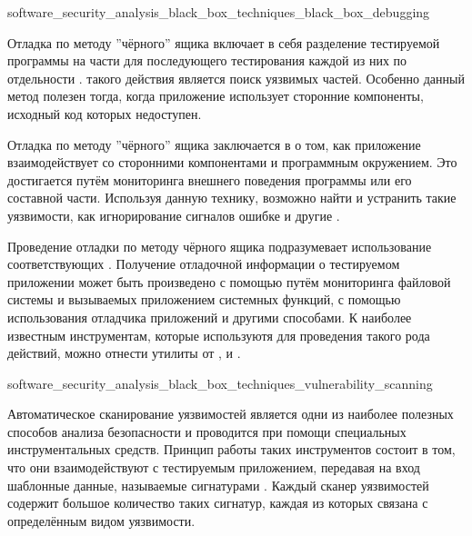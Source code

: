 
	{software_security_analysis_black_box_techniques_black_box_debugging}

%
Отладка по методу ''чёрного'' ящика включает в себя разделение тестируемой программы на части для последующего тестирования каждой из них по отдельности . 
%
 такого действия является поиск уязвимых частей. Особенно данный метод полезен тогда, когда приложение использует сторонние компоненты, исходный код которых недоступен.

%
Отладка по методу ''чёрного'' ящика заключается в  о том, как приложение взаимодействует со сторонними компонентами и программным окружением. 
%
Это достигается путём мониторинга внешнего поведения программы или его составной части. 
%
Используя данную технику, возможно найти и устранить такие уязвимости, как игнорирование сигналов ошибке и другие .

%
Проведение отладки по методу чёрного ящика подразумевает использование соответствующих . 
%
Получение отладочной информации о тестируемом приложении может быть произведено с помощью путём мониторинга файловой системы и вызываемых приложением системных функций, с помощью использования отладчика приложений и другими способами. 
%
К наиболее известным инструментам, которые используютя для проведения такого рода действий, можно отнести утилиты от  ,   и  .


	{software_security_analysis_black_box_techniques_vulnerability_scanning}

%
Автоматическое сканирование уязвимостей является одни из наиболее полезных способов анализа безопасности  и проводится при помощи специальных инструментальных средств. 
%
Принцип работы таких инструментов состоит в том, что они взаимодействуют с тестируемым приложением, передавая на вход шаблонные данные, называемые сигнатурами . 
%
Каждый сканер уязвимостей содержит большое количество таких сигнатур, каждая из которых связана с определённым видом уязвимости.

